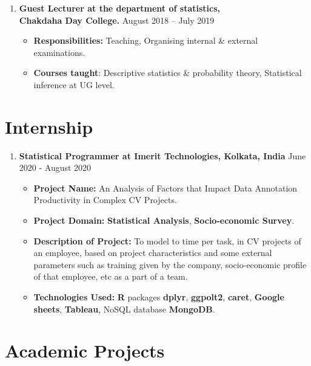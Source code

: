 \documentclass[margin,line]{res}
\begin{document}
\begin{resume}
\begin{enumerate}
\item
{\bf Guest Lecturer at the department of statistics,\\ Chakdaha Day College. }\hfill{August 2018 – July 2019}

\begin{itemize}
\item
\textbf{Responsibilities: }Teaching, Organising internal \& external examinations.
\item
\textbf{Courses taught}: Descriptive statistics \& probability theory, Statistical inference at UG level.
\end{itemize}
\end{enumerate}

\section{\sc Internship}
\begin{enumerate}
\item
{\bf Statistical Programmer at Imerit Technologies, Kolkata, India }\hfill{June 2020 - August 2020}

\begin{itemize}
\item
\textbf{Project Name:} An Analysis of Factors that Impact Data Annotation Productivity in Complex CV Projects.
\item
\textbf{Project Domain: }\textbf{Statistical Analysis},  \textbf{Socio-economic Survey}.
\item
\textbf{Description of Project: }To model to time per task, in CV projects of an employee, based on project characteristics and some external parameters such as training given by the company, socio-economic profile of that employee, etc as a part of a team.

\item
\textbf{Technologies Used:} \textbf{R} packages \textbf{dplyr}, \textbf{ggpolt2}, \textbf{caret}, \textbf{Google sheets}, \textbf{Tableau}, NoSQL database \textbf{MongoDB}.
\end{itemize}
\end{enumerate}






\section{\sc Academic Projects }

\begin{enumerate}


\end{enumerate}
\end{resume}
\end{document}
